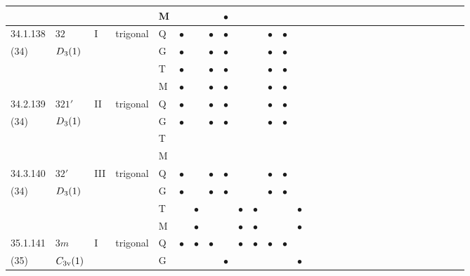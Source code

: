 \documentclass[fleqn,9pt,landscape]{jsarticle}
\begin{document}
\begin{longtable}{lllll|l|l|l|l|l|l|l|l|l|ll|ll|ll|ll|ll|ll|ll|ll}
 &  &  &  & M &  &  &  & $\bullet$ &  &  &  &  &  &  &  &  &  &  &  &  &  &  &  &  &  &  &  &  &  \\ \hline
34.1.138 & \texttt{$32$} & I & trigonal & Q & $\bullet$ &  & $\bullet$ & $\bullet$ &  &  & $\bullet$ & $\bullet$ &  &  &  &  &  &  &  &  &  &  &  &  &  &  &  &  &  \\
(34) & $D_{\rm 3}(1)$ &  &  & G & $\bullet$ &  & $\bullet$ & $\bullet$ &  &  & $\bullet$ & $\bullet$ &  &  &  &  &  &  &  &  &  &  &  &  &  &  &  &  &  \\
 &  &  &  & T & $\bullet$ &  & $\bullet$ & $\bullet$ &  &  & $\bullet$ & $\bullet$ &  &  &  &  &  &  &  &  &  &  &  &  &  &  &  &  &  \\
 &  &  &  & M & $\bullet$ &  & $\bullet$ & $\bullet$ &  &  & $\bullet$ & $\bullet$ &  &  &  &  &  &  &  &  &  &  &  &  &  &  &  &  &  \\ \hline
34.2.139 & \texttt{$321'$} & II & trigonal & Q & $\bullet$ &  & $\bullet$ & $\bullet$ &  &  & $\bullet$ & $\bullet$ &  &  &  &  &  &  &  &  &  &  &  &  &  &  &  &  &  \\
(34) & $D_{\rm 3}(1)$ &  &  & G & $\bullet$ &  & $\bullet$ & $\bullet$ &  &  & $\bullet$ & $\bullet$ &  &  &  &  &  &  &  &  &  &  &  &  &  &  &  &  &  \\
 &  &  &  & T &  &  &  &  &  &  &  &  &  &  &  &  &  &  &  &  &  &  &  &  &  &  &  &  &  \\
 &  &  &  & M &  &  &  &  &  &  &  &  &  &  &  &  &  &  &  &  &  &  &  &  &  &  &  &  &  \\ \hline
34.3.140 & \texttt{$32'$} & III & trigonal & Q & $\bullet$ &  & $\bullet$ & $\bullet$ &  &  & $\bullet$ & $\bullet$ &  &  &  &  &  &  &  &  &  &  &  &  &  &  &  &  &  \\
(34) & $D_{\rm 3}(1)$ &  &  & G & $\bullet$ &  & $\bullet$ & $\bullet$ &  &  & $\bullet$ & $\bullet$ &  &  &  &  &  &  &  &  &  &  &  &  &  &  &  &  &  \\
 &  &  &  & T &  & $\bullet$ &  &  & $\bullet$ & $\bullet$ &  &  & $\bullet$ &  &  &  &  &  &  &  &  &  &  &  &  &  &  &  &  \\
 &  &  &  & M &  & $\bullet$ &  &  & $\bullet$ & $\bullet$ &  &  & $\bullet$ &  &  &  &  &  &  &  &  &  &  &  &  &  &  &  &  \\ \hline
35.1.141 & \texttt{$3m$} & I & trigonal & Q & $\bullet$ & $\bullet$ & $\bullet$ &  & $\bullet$ & $\bullet$ & $\bullet$ & $\bullet$ &  &  &  &  &  &  &  &  &  &  &  &  &  &  &  &  &  \\
(35) & $C_{\rm 3v}(1)$ &  &  & G &  &  &  & $\bullet$ &  &  &  &  & $\bullet$ &  &  &  &  &  &  &  &  &  &  &  &  &  &  &  &  \\

\end{longtable}
\end{document}
